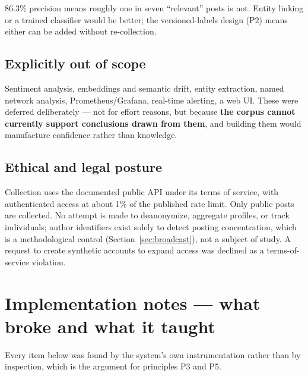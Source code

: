 \documentclass[11pt]{article}
\begin{document}
\begin{description}[leftmargin=1.4em,style=nextline,itemsep=0.45em]
\item[Rule-based relevance.] 86.3\% precision means roughly one in seven
  ``relevant'' posts is not. Entity linking or a trained classifier would be
  better; the versioned-labels design (P2) means either can be added without
  re-collection.
\end{description}

\subsection{Explicitly out of scope}

Sentiment analysis, embeddings and semantic drift, entity extraction, named
network analysis, Prometheus/Grafana, real-time alerting, a web UI. These were
deferred deliberately --- not for effort reasons, but because \textbf{the corpus
cannot currently support conclusions drawn from them}, and building them would
manufacture confidence rather than knowledge.

\subsection{Ethical and legal posture}

Collection uses the documented public API under its terms of service, with
authenticated access at about 1\% of the published rate limit. Only public posts
are collected. No attempt is made to deanonymize, aggregate profiles, or track
individuals; author identifiers exist solely to detect posting concentration,
which is a methodological control (Section~\ref{sec:broadcast}), not a subject of
study. A request to create synthetic accounts to expand access was declined as a
terms-of-service violation.

\section{Implementation notes --- what broke and what it taught}
\label{sec:incidents}

Every item below was found by the system's own instrumentation rather than by
inspection, which is the argument for principles P3 and P5.
\end{document}

